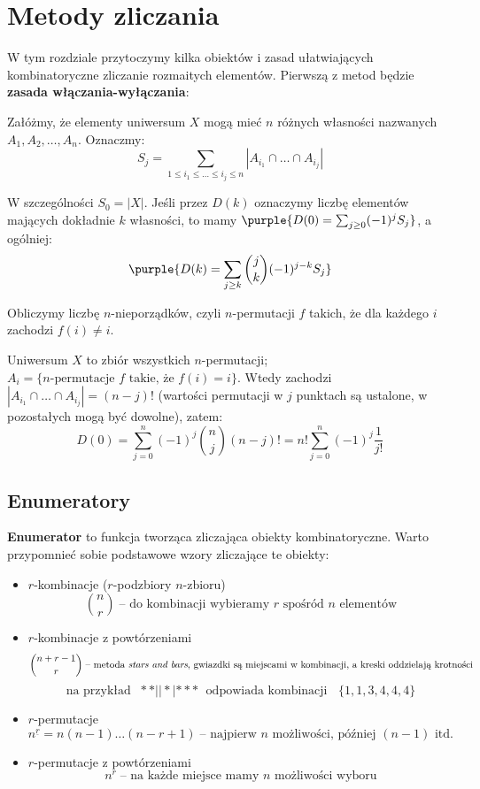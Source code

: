 \section{Metody zliczania}

W tym rozdziale przytoczymy kilka obiektów i zasad ułatwiających kombinatoryczne zliczanie rozmaitych elementów. Pierwszą z metod będzie \textbf{zasada włączania-wyłączania}:

Załóżmy, że elementy uniwersum $X$ mogą mieć $n$ różnych własności nazwanych $A_1, A_2, \dots, A_n$. Oznaczmy:
$$S_j = \sum_{1 \leq i_1 \leq \dots \leq i_j \leq n} |A_{i_1} \cap \dots \cap A_{i_j}|$$

W szczególności $S_0 = |X|$. Jeśli przez $D(k)$ oznaczymy liczbę elementów mających dokładnie $k$ własności, to mamy $\purple{D(0) = \sum_{j \geq 0} (-1)^j S_j}$, a ogólniej:
$$\purple{D(k) = \sum_{j \geq k} \binom{j}{k} (-1)^{j - k} S_j}$$

\begin{example}
    Obliczymy liczbę $n$-nieporządków, czyli $n$-permutacji $f$ takich, że dla każdego $i$ zachodzi $f(i) \neq i$.

    Uniwersum $X$ to zbiór wszystkich $n$-permutacji; $A_i = \{ \text{$n$-permutacje $f$ takie, że $f(i) = i$} \}$. Wtedy zachodzi $|A_{i_1} \cap \dots \cap A_{i_j}| = (n - j)!$ (wartości permutacji w $j$ punktach są ustalone, w pozostałych mogą być dowolne), zatem:
    $$D(0) = \sum_{j = 0}^n (-1)^j \binom{n}{j} (n - j)! = n! \sum_{j = 0}^n (-1)^j \frac{1}{j!}$$
\end{example}

\subsection{Enumeratory}
\textbf{Enumerator} to funkcja tworząca zliczająca obiekty kombinatoryczne. Warto przypomnieć sobie podstawowe wzory zliczające te obiekty:
\begin{itemize}
    \item $r$-kombinacje ($r$-podzbiory $n$-zbioru)
    $$\binom{n}{r} \; \text{-- do kombinacji wybieramy $r$ spośród $n$ elementów}$$
    \item $r$-kombinacje z powtórzeniami
    $$\binom{n + r - 1}{r} \; \text{-- metoda \textit{stars and bars}, gwiazdki są miejscami w kombinacji, a kreski oddzielają krotności}$$
    $$\text{na przykład } \; * * | | * | * * * \; \text{ odpowiada kombinacji } \; \; \{1, 1, 3, 4, 4, 4\}$$
    \item $r$-permutacje
    $$n^{\underline r} = n (n - 1) \dots (n - r + 1)
    \; \text{-- najpierw $n$ możliwości, później $(n - 1)$ itd.}$$
    \item $r$-permutacje z powtórzeniami
    $$n^r \; \text{-- na każde miejsce mamy $n$ możliwości wyboru}$$
\end{itemize}

